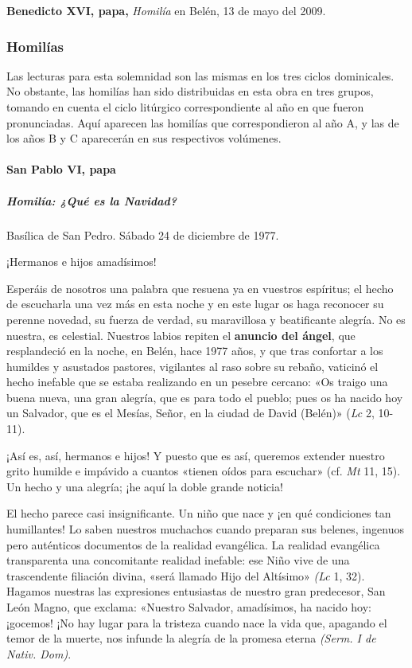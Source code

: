 \documentclass[]{article}
\let\oldparagraph\paragraph
\renewcommand{\paragraph}[1]{\oldparagraph{#1}\mbox{}}
\let\oldsubparagraph\subparagraph
\renewcommand{\subparagraph}[1]{\oldsubparagraph{#1}\mbox{}}
\begin{document}
\textbf{Benedicto XVI, papa,} \emph{Homilía} en Belén, 13 de mayo del
2009.

\protect\hypertarget{_Toc448662781}{}{\protect\hypertarget{_Toc448690300}{}{}}

\subsubsection{Homilías}\label{homiluxedas-5}

Las lecturas para esta solemnidad son las mismas en los tres ciclos
dominicales. No obstante, las homilías han sido distribuidas en esta
obra en tres grupos, tomando en cuenta el ciclo litúrgico
correspondiente al año en que fueron pronunciadas. Aquí aparecen las
homilías que correspondieron al año A, y las de los años B y C
aparecerán en sus respectivos volúmenes.

\paragraph{San Pablo VI, papa}\label{san-pablo-vi-papa}

\subparagraph{Homilía: ¿Qué es la
Navidad?}\label{homiluxeda-quuxe9-es-la-navidad}

Basílica de San Pedro. Sábado 24 de diciembre de 1977.

¡Hermanos e hijos amadísimos!

Esperáis de nosotros una palabra que resuena ya en vuestros espíritus;
el hecho de escucharla una vez más en esta noche y en este lugar os haga
reconocer su perenne novedad, su fuerza de verdad, su maravillosa y
beatificante alegría. No es nuestra, es celestial. Nuestros labios
repiten el \textbf{anuncio del ángel}, que resplandeció en la noche, en
Belén, hace 1977 años, y que tras confortar a los humildes y asustados
pastores, vigilantes al raso sobre su rebaño, vaticinó el hecho inefable
que se estaba realizando en un pesebre cercano: «Os traigo una buena
nueva, una gran alegría, que es para todo el pueblo; pues os ha nacido
hoy un Salvador, que es el Mesías, Señor, en la ciudad de David (Belén)»
(\emph{Lc} 2, 10-11).

¡Así es, así, hermanos e hijos! Y puesto que es así, queremos extender
nuestro grito humilde e impávido a cuantos «tienen oídos para escuchar»
(cf. \emph{Mt} 11, 15). Un hecho y una alegría; ¡he aquí la doble grande
noticia!

El hecho parece casi insignificante. Un niño que nace y ¡en qué
condiciones tan humillantes! Lo saben nuestros muchachos cuando preparan
sus belenes, ingenuos pero auténticos documentos de la realidad
evangélica. La realidad evangélica transparenta una concomitante
realidad inefable: ese Niño vive de una trascendente filiación divina,
«será llamado Hijo del Altísimo» \emph{(Lc} 1, 32). Hagamos nuestras las
expresiones entusiastas de nuestro gran predecesor, San León Magno, que
exclama: «Nuestro Salvador, amadísimos, ha nacido hoy: ¡gocemos! ¡No hay
lugar para la tristeza cuando nace la vida que, apagando el temor de la
muerte, nos infunde la alegría de la promesa eterna \emph{(Serm. I de
Nativ. Dom)}.
\end{document}
